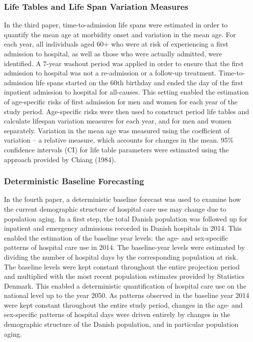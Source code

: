 \subsubsection*{Life Tables and Life Span Variation Measures}

In the third paper, time-to-admission life spans were estimated in order 
to quantify the mean age at morbidity onset and variation in the mean age. 
For each year, all individuals aged 60+ who were at risk of experiencing 
a first admission to hospital, as well as those who were actually admitted, 
were identified. A 7-year washout period was applied in order to ensure 
that the first admission to hospital was not a re-admission or a follow-up 
treatment. Time-to-admission life spans started on the 60th birthday and 
ended the day of the first inpatient admission to hospital for all-causes. 
This setting enabled the estimation of age-specific risks of first admission 
for men and women for each year of the study period. Age-specific risks were 
then used to construct period life tables and calculate lifespan variation 
measures for each year, and for men and women separately.\citep{preston2000demography} 
Variation in the mean age was measured using the coefficient of variation -- 
a relative measure, which accounts for changes in the mean. 95\% confidence 
intervals (CI) for life table parameters were estimated using the approach 
provided by Chiang (1984).\citep{chiang1984lifetable} \\


\subsubsection*{Deterministic Baseline Forecasting}

In the fourth paper, a deterministic baseline forecast was used to examine 
how the current demographic structure of hospital care use may change due 
to population aging.\citep{ganguly2016using,bohk2018forecast} In a first 
step, the total Danish population was followed up for inpatient and emergency 
admissions recorded in Danish hospitals in 2014. This enabled the estimation 
of the baseline year levels: the age- and sex-specific patterns of hospital 
care use in 2014. The baseline-year levels were estimated by dividing the 
number of hospital days by the corresponding population at risk. The baseline 
levels were kept constant throughout the entire projection period and 
multiplied with the most recent population estimates provided by Statistics 
Denmark.\citep{denstat2018frdk218,denstat2018projection} This enabled a 
deterministic quantification of hospital care use on the national level 
up to the year 2050. As patterns observed in the baseline year 2014 were 
kept constant throughout the entire study period, changes in the age- 
and sex-specific patterns of hospital days were driven entirely by changes 
in the demographic structure of the Danish population, and in particular 
population aging.\\



